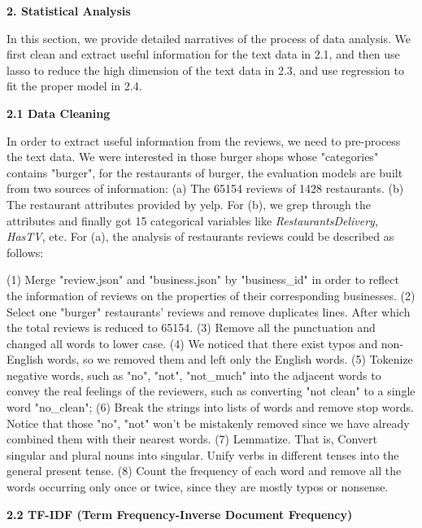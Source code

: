 \documentclass[12pt]{article}
\begin{document}
	\noindent\textbf{2. Statistical Analysis}
	
	In this section, we provide detailed narratives of the process of data analysis. We first clean and extract useful information for the text data in 2.1, and then use lasso to reduce the high dimension of the text data in 2.3, and use regression to fit the proper model in 2.4.
	
	\noindent\textbf{2.1 Data Cleaning}
	
	In order to extract useful information from the reviews, we need to pre-process the text data. We were interested in those burger shops whose "categories" contains "burger", for the restaurants of burger, the evaluation models are built from two sources of information: (a) The 65154 reviews of 1428 restaurants. (b) The restaurant attributes provided by yelp. For (b), we grep through the attributes and finally got 15 categorical variables like \textit{RestaurantsDelivery}, \textit{HasTV}, etc.
	For (a), the analysis of restaurants reviews could be described as follows:
	
	(1) Merge "review.json" and "business.json" by "business\_id" in order to reflect the information of reviews on the properties of their corresponding businesses.
	(2) Select one "burger" restaurants' reviews and remove duplicates lines. After which the total reviews is reduced to 65154.
	(3) Remove all the punctuation and changed all words to lower case.
	(4) We noticed that there exist typos and non-English words, so we removed them and left only the English words.
	(5) Tokenize negative words, such as "no", "not", "not\_much" into the adjacent words to convey the real feelings of the reviewers, such as converting "not clean" to a single word "no\_clean";
	(6) Break the strings into lists of words and remove stop words. Notice that those "no", "not" won't be mistakenly removed since we have already combined them with their nearest words.
	(7) Lemmatize. That is, Convert singular and plural nouns into singular. Unify verbs in different tenses into the general present tense.
	(8) Count the frequency of each word and remove all the words occurring only once or twice, since they are mostly typos or nonsense.
	
	\noindent\textbf{2.2 TF-IDF (Term Frequency-Inverse Document Frequency)}
	
\end{document}
